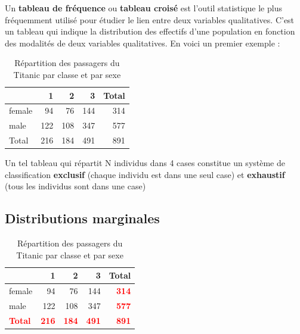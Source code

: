 \documentclass[
]{book}
\begin{document}
Un \textbf{tableau de fréquence} ou \textbf{tableau croisé} est l'outil statistique le plus fréquemment utilisé pour étudier le lien entre deux variables qualitatives. C'est un tableau qui indique la distribution des effectifs d'une population en fonction des modalités de deux variables qualitatives. En voici un premier exemple :

\begin{table}

\caption{\label{tab:unnamed-chunk-14}Répartition des passagers du Titanic par classe et par sexe}
\centering
\begin{tabular}[t]{l|r|r|r|r}
\hline
  & 1 & 2 & 3 & Total\\
\hline
female & 94 & 76 & 144 & 314\\
\hline
male & 122 & 108 & 347 & 577\\
\hline
Total & 216 & 184 & 491 & 891\\
\hline
\end{tabular}
\end{table}

Un tel tableau qui répartit N individus dans 4 cases constitue un système de classification \textbf{exclusif} (chaque individu est dans une seul case) et \textbf{exhaustif} (tous les individus sont dans une case)

\hypertarget{distributions-marginales}{%
\subsection{Distributions marginales}\label{distributions-marginales}}

\begin{table}

\caption{\label{tab:unnamed-chunk-15}Répartition des passagers du Titanic par classe et par sexe}
\centering
\begin{tabular}[t]{l|r|r|r|>{}r}
\hline
  & 1 & 2 & 3 & Total\\
\hline
female & 94 & 76 & 144 & \textcolor{red}{\textbf{314}}\\
\hline
male & 122 & 108 & 347 & \textcolor{red}{\textbf{577}}\\
\hline
\textcolor{red}{\textbf{Total}} & \textcolor{red}{\textbf{216}} & \textcolor{red}{\textbf{184}} & \textcolor{red}{\textbf{491}} & \textcolor{red}{\textbf{\textbf{891}}}\\
\hline
\end{tabular}
\end{table}
\end{document}
